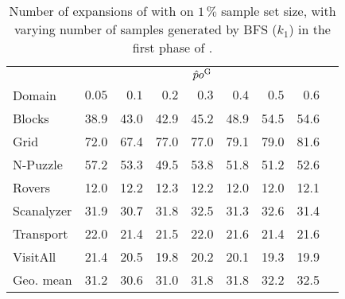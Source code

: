 \begin{table}[!h]
\centering
\caption[Expansions of \pog with varying values of $k_{1}$]{Number of expansions of \hnn with \pog on $1\,\%$ sample set size, with varying number of samples generated by BFS ($k_{1}$) in the first phase of \bfsrs.}
\label{tab:bfsss_pct}
\vspace{\baselineskip}
\begin{tabular}{lrrrrrrrr}
\toprule
& \multicolumn{7}{c}{$\hat po^{\text{G}}$} \\
\cmidrule(lr){2-8}
Domain     & $0.05$ &$0.1$ & $0.2$   & $0.3$ & $0.4$ & $0.5$ & $0.6$ \\ \midrule
Blocks     & 38.9   & 43.0  & 42.9  & 45.2  & 48.9  & 54.5  & 54.6  \\
Grid       & 72.0   & 67.4  & 77.0  & 77.0  & 79.1  & 79.0  & 81.6  \\
N-Puzzle   & 57.2   & 53.3  & 49.5  & 53.8  & 51.8  & 51.2  & 52.6  \\
Rovers     & 12.0   & 12.2  & 12.3  & 12.2  & 12.0  & 12.0  & 12.1  \\
Scanalyzer & 31.9   & 30.7  & 31.8  & 32.5  & 31.3  & 32.6  & 31.4  \\
Transport  & 22.0   & 21.4  & 21.5  & 22.0  & 21.6  & 21.4  & 21.6  \\
VisitAll   & 21.4   & 20.5  & 19.8  & 20.2  & 20.1  & 19.3  & 19.9  \\ \midrule
Geo. mean  & 31.2   & 30.6  & 31.0  & 31.8  & 31.8  & 32.2  & 32.5  \\ \bottomrule
\end{tabular}
\end{table}
